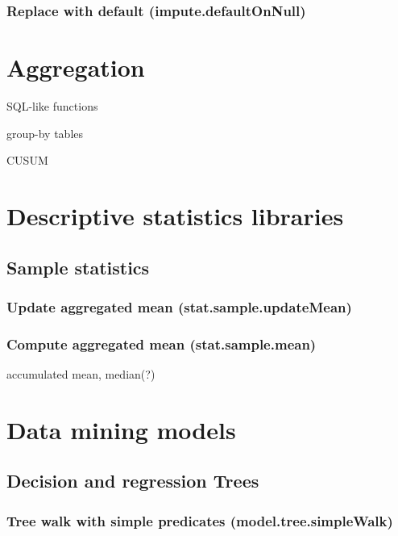 \documentclass{article}
\theoremstyle{definition}
\begin{document}
\subsubsection{Replace with default (impute.defaultOnNull)}

\pagebreak

\section{Aggregation}

SQL-like functions

group-by tables

CUSUM

\pagebreak

\section{Descriptive statistics libraries}

\subsection{Sample statistics}

\subsubsection{Update aggregated mean (stat.sample.updateMean)}

\subsubsection{Compute aggregated mean (stat.sample.mean)}

accumulated mean, median(?)

\pagebreak

\section{Data mining models}

\subsection{Decision and regression Trees}

\subsubsection{Tree walk with simple predicates (model.tree.simpleWalk)}
\end{document}

